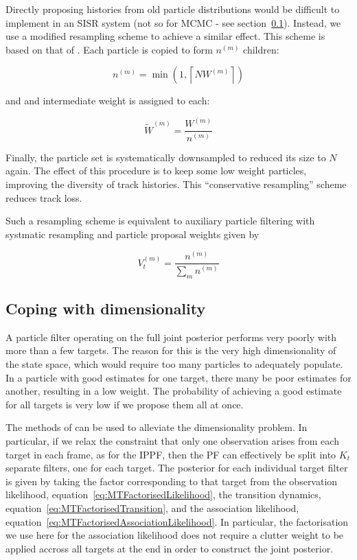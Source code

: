 Directly proposing histories from old particle distributions would be difficult to implement in an SISR system (not so for MCMC - see section~\ref{}). Instead, we use a modified resampling scheme to achieve a similar effect. This scheme is based on that of \cite{Godsill2007}. Each particle is copied to form $n^{(m)}$ children:

\begin{equation}
n^{(m)} = \min(1,\left\lceil N W^{(m)} \right\rceil)
\label{eq:}
\end{equation}

and and intermediate weight is assigned to each:

\begin{equation}
\tilde{W}^{(m)} = \frac{W^{(m)}}{n^{(m)}}
\label{eq:}
\end{equation}

Finally, the particle set is systematically downsampled to reduced its size to $N$ again. The effect of this procedure is to keep some low weight particles, improving the diversity of track histories. This ``conservative resampling'' scheme reduces track loss.

Such a resampling scheme is equivalent to auxiliary particle filtering with systmatic resampling and particle proposal weights given by

\begin{equation}
V_t^{(m)} = \frac{n^{(m)}}{\sum_m n^{(m)}}
\label{eq:}
\end{equation}



\subsection{Coping with dimensionality}
A particle filter operating on the full joint posterior performs very poorly with more than a few targets. The reason for this is the very high dimensionality of the state space, which would require too many particles to adequately populate. In a particle with good estimates for one target, there many be poor estimates for another, resulting in a low weight. The probability of achieving a good estimate for all targets is very low if we propose them all at once.

The methods of \cite{Vermaak2005} can be used to alleviate the dimensionality problem. In particular, if we relax the constraint that only one observation arises from each target in each frame, as for the IPPF, then the PF can effectively be split into $K_t$ separate filters, one for each target. The posterior for each individual target filter is given by taking the factor corresponding to that target from the observation likelihood, equation~\ref{eq:MTFactorisedLikelihood}, the transition dynamics, equation~\ref{eq:MTFactorisedTransition}, and the association likelihood, equation~\ref{eq:MTFactorisedAssociationLikelihood}. In particular, the factorisation we use here for the association likelihood does not require a clutter weight to be applied accross all targets at the end in order to construct the joint posterior.

